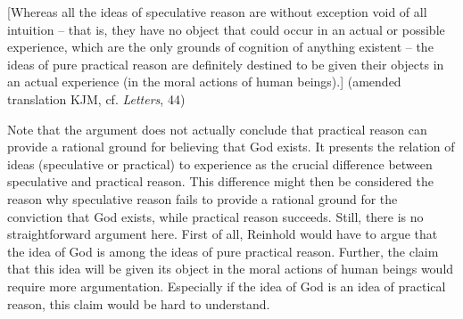 [Whereas all the ideas of speculative reason are without exception void of all intuition {--} that is, they have no object that could occur in an actual or possible experience, which are the only grounds of cognition of anything existent {--} the ideas of pure practical reason are definitely destined to be given their objects in an actual experience (in the moral actions of human beings).] (amended translation KJM, cf. \textit{Letters}, 44) 

Note that the argument does not actually conclude that practical reason can provide a rational ground for believing that God exists. It presents the relation of ideas (speculative or practical) to experience as the crucial difference between speculative and practical reason. This difference might then be considered the reason why speculative reason fails to provide a rational ground for the conviction that God exists, while practical reason succeeds. Still, there is no straightforward argument here. First of all, Reinhold would have to argue that the idea of God is among the ideas of pure practical reason. Further, the claim that this idea will be given its object in the moral actions of human beings would require more argumentation. Especially if the idea of God is an idea of practical reason, this claim would be hard to understand. 

